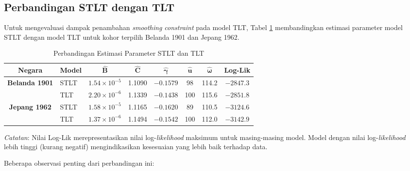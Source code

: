 \subsection{Perbandingan STLT dengan TLT}

Untuk mengevaluasi dampak penambahan \textit{smoothing constraint} pada model TLT, Tabel \ref{tab:stlt_vs_tlt_comparison} membandingkan estimasi parameter model STLT dengan model TLT untuk kohor terpilih Belanda 1901 dan Jepang 1962.

\begin{table}[H]
\centering
\caption{Perbandingan Estimasi Parameter STLT dan TLT}
\label{tab:stlt_vs_tlt_comparison}
\small
\begin{tabular}{clcccccc}
\hline
\textbf{Negara} & \textbf{Model} & $\boldsymbol{\hat{B}}$ & $\boldsymbol{\hat{C}}$ & $\boldsymbol{\hat{\gamma}}$ & $\boldsymbol{\hat{u}}$ & $\boldsymbol{\hat{\omega}}$ & \textbf{Log-Lik} \\
\hline
\multirow{2}{*}{\textbf{Belanda 1901}} 
& STLT & $1.54 \times 10^{-5}$ & 1.1090 & $-0.1579$ & 98 & 114.2 & $-2847.3$ \\
& TLT & $2.20 \times 10^{-6}$ & 1.1339 & $-0.1438$ & 100 & 115.6 & $-2851.8$ \\
\hline
\multirow{2}{*}{\textbf{Jepang 1962}} 
& STLT & $1.58 \times 10^{-5}$ & 1.1165 & $-0.1620$ & 89 & 110.5 & $-3124.6$ \\
& TLT & $1.37 \times 10^{-6}$ & 1.1494 & $-0.1542$ & 100 & 112.0 & $-3142.9$ \\
\hline
\end{tabular}
\begin{tablenotes}
\small
\item \textit{Catatan}: Nilai Log-Lik merepresentasikan nilai log-\textit{likelihood} maksimum untuk masing-masing model. Model dengan nilai log-\textit{likelihood} lebih tinggi (kurang negatif) mengindikasikan kesesuaian yang lebih baik terhadap data.
\end{tablenotes}
\end{table}

Beberapa observasi penting dari perbandingan ini:

